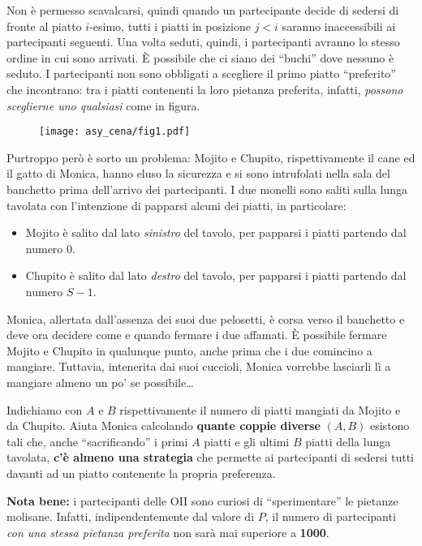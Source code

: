 Non è permesso scavalcarsi, quindi quando un partecipante decide di sedersi di
fronte al piatto $i$-esimo, tutti i piatti in posizione $j < i$ saranno
inaccessibili ai partecipanti seguenti. Una volta seduti, quindi, i partecipanti
avranno lo stesso ordine in cui sono arrivati. È possibile che ci siano dei
``buchi'' dove nessuno è seduto. I partecipanti non sono obbligati a scegliere
il primo piatto ``preferito'' che incontrano: tra i piatti contenenti la loro
pietanza preferita, infatti, \emph{possono sceglierne uno qualsiasi} come in figura.

\begin{figure}[H]%
	\centering\texttt{[image: asy\_cena/fig1.pdf]}
\end{figure}

Purtroppo però è sorto un problema: Mojito e Chupito, rispettivamente il cane ed
il gatto di Monica, hanno eluso la sicurezza e si sono intrufolati nella sala
del banchetto prima dell'arrivo dei partecipanti. I due monelli sono saliti
sulla lunga tavolata con l'intenzione di papparsi alcuni dei piatti, in
particolare:
\begin{itemize}[nolistsep]
	\item Mojito è salito dal lato \emph{sinistro} del tavolo, per papparsi i
	piatti partendo dal numero $0$.
	\item Chupito è salito dal lato \emph{destro} del tavolo, per papparsi i
	piatti partendo dal numero $S-1$.
\end{itemize}

Monica, allertata dall'assenza dei suoi due pelosetti, è corsa verso il
banchetto e deve ora decidere come e quando fermare i due affamati. È possibile
fermare Mojito e Chupito in qualunque punto, anche prima che i due comincino a
mangiare. Tuttavia, intenerita dai suoi cuccioli, Monica vorrebbe lasciarli lì a
mangiare almeno un po' se possibile\dots

Indichiamo con $A$ e $B$ rispettivamente il numero di piatti mangiati da Mojito
e da Chupito. Aiuta Monica calcolando \textbf{quante coppie diverse} $(A, B)$
esistono tali che, anche ``sacrificando'' i primi $A$ piatti e gli ultimi $B$
piatti della lunga tavolata, \textbf{c'è almeno una strategia} che permette ai
partecipanti di sedersi tutti davanti ad un piatto contenente la propria
preferenza.

\begin{danger}
	\textbf{Nota bene:} i partecipanti delle OII sono curiosi di
	``sperimentare'' le pietanze molisane. Infatti, indipendentemente dal valore
	di $P$, il numero di partecipanti \emph{con una stessa pietanza preferita}
	non sarà mai superiore a \textbf{1000}.
\end{danger}

